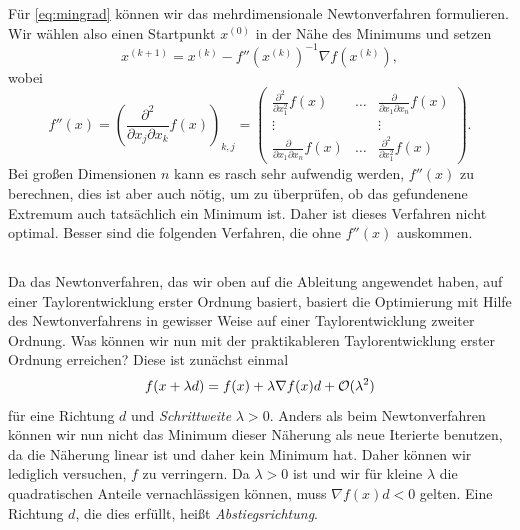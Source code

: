 Für \eqref{eq:mingrad} können wir das mehrdimensionale Newtonverfahren
formulieren. Wir wählen also einen Startpunkt $x^{(0)}$ in der Nähe
des Minimums und setzen
\begin{equation}
  x^{(k+1)} = x^{(k)} - f''\left(x^{(k)}\right)^{-1}\nabla f\left(x^{(k)}\right),
\end{equation}
wobei
\begin{equation}
  f''(x) = 
  \left(\frac{\partial^2}{\partial x_j\partial x_k}f(x)\right)_{k,j} = 
  \begin{pmatrix}
    \frac{\partial^2}{\partial x_1^2}f(x) & \ldots &
    \frac{\partial}{\partial x_1\partial x_n}f(x)\\
    \vdots               &        & \vdots \\
    \frac{\partial}{\partial x_1\partial x_n}f(x) & \ldots &
    \frac{\partial^2}{\partial x_1^2}f(x)
  \end{pmatrix}.
\end{equation}
Bei großen Dimensionen $n$ kann es rasch sehr aufwendig werden,
$f''(x)$ zu berechnen, dies ist aber auch nötig, um zu überprüfen,
ob das gefundenene Extremum auch tatsächlich ein Minimum ist. Daher
ist dieses Verfahren nicht optimal. Besser sind die folgenden
Verfahren, die ohne $f''(x)$ auskommen.

\subsection{}

Da das Newtonverfahren, das wir oben auf die Ableitung angewendet
haben, auf einer Taylorentwicklung erster Ordnung
basiert, basiert die Optimierung mit Hilfe des Newtonverfahrens in
gewisser Weise auf einer Taylorentwicklung zweiter Ordnung. Was können
wir nun mit der praktikableren Taylorentwicklung erster Ordnung
erreichen? Diese ist zunächst einmal
\begin{equation}
  \label{eq:steepestdescentexpand}
  f(x + \lambda d) = f(x) + \lambda \nabla f(x)d + \mathcal O(\lambda^2)
\end{equation}
für eine Richtung $d$ und \emph{Schrittweite} $\lambda > 0$.  Anders
als beim Newtonverfahren können wir nun nicht das Minimum dieser
Näherung als neue Iterierte benutzen, da die Näherung linear ist und
daher kein Minimum hat. Daher können wir lediglich versuchen, $f$ zu
verringern. Da $\lambda>0$ ist und wir für kleine $\lambda$ die
quadratischen Anteile vernachlässigen können, muss $\nabla f(x)d < 0$
gelten. Eine Richtung $d$, die dies erfüllt, heißt
\emph{Abstiegsrichtung}.

